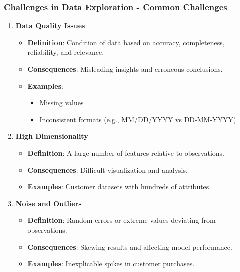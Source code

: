 \documentclass[aspectratio=169]{beamer}
\begin{document}
\begin{frame}[fragile]
    \frametitle{Challenges in Data Exploration - Common Challenges}
    \begin{enumerate}
        \item \textbf{Data Quality Issues}
        \begin{itemize}
            \item \textbf{Definition}: Condition of data based on accuracy, completeness, reliability, and relevance.
            \item \textbf{Consequences}: Misleading insights and erroneous conclusions.
            \item \textbf{Examples}:
            \begin{itemize}
                \item Missing values
                \item Inconsistent formats (e.g., MM/DD/YYYY vs DD-MM-YYYY)
            \end{itemize}
        \end{itemize}
        
        \item \textbf{High Dimensionality}
        \begin{itemize}
            \item \textbf{Definition}: A large number of features relative to observations.
            \item \textbf{Consequences}: Difficult visualization and analysis.
            \item \textbf{Examples}: Customer datasets with hundreds of attributes.
        \end{itemize}
        
        \item \textbf{Noise and Outliers}
        \begin{itemize}
            \item \textbf{Definition}: Random errors or extreme values deviating from observations.
            \item \textbf{Consequences}: Skewing results and affecting model performance.
            \item \textbf{Examples}: Inexplicable spikes in customer purchases.
        \end{itemize}
    \end{enumerate}
\end{frame}
\end{document}
